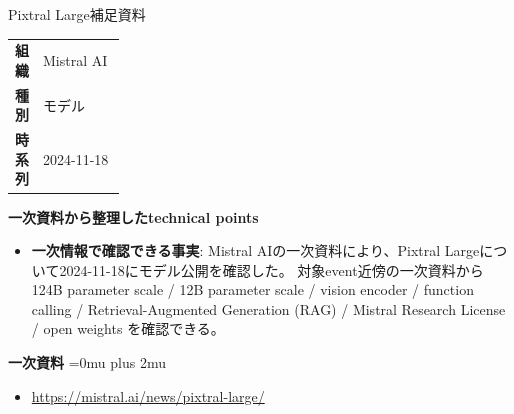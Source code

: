 \begin{technicalnote}{Pixtral Large}{補足資料}
\begingroup
\begin{tabularx}{\linewidth}{@{}>{\bfseries}p{0.22\linewidth}X@{}}
組織 & Mistral AI \\
種別 & モデル \\
時系列 & 2024-11-18 \\
\end{tabularx}
\smallskip
{\bfseries 一次資料から整理したtechnical points}
\begin{itemize}[leftmargin=1.5em,itemsep=0.35em]
\item \textbf{一次情報で確認できる事実}: Mistral AIの一次資料により、Pixtral Largeについて2024-11-18にモデル公開を確認した。 対象event近傍の一次資料から 124B parameter scale / 12B parameter scale / vision encoder / function calling / Retrieval-Augmented Generation (RAG) / Mistral Research License / open weights を確認できる。
\end{itemize}
\begin{minipage}{\linewidth}
\begin{samepage}
{\bfseries 一次資料}
\begingroup\sloppy
\Urlmuskip=0mu plus 2mu\relax
\begin{itemize}[leftmargin=1.5em,itemsep=0.25em]
\item {\scriptsize\url{https://mistral.ai/news/pixtral-large/}}
\end{itemize}
\endgroup
\end{samepage}
\end{minipage}
\endgroup
\end{technicalnote}
\medskip

